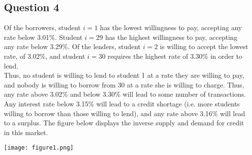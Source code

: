 \documentclass{article}
\begin{document}

\subsection*{Question 4}
Of the borrowers, student $i=1$ has the lowest willingness to pay, accepting any rate below 3.01\%. Student ${i=29}$ has the highest willingness to pay, accepting any rate below 3.29\%. Of the lenders, student ${i=2}$ is willing to accept the lowest rate, of 3.02\%, and student ${i=30}$ requires the highest rate of 3.30\% in order to lend.
\medskip \\
Thus, no student is willing to lend to student 1 at a rate they are willing to pay, and nobody is willing to borrow from 30 at a rate she is willing to charge. Thus, any rate above 3.02\% and below 3.30\% will lead to some number of transactions. Any interest rate below 3.15\% will lead to a credit shortage (i.e. more students willing to borrow than those willing to lend), and any rate above 3.16\% will lead to a surplus. The figure below displays the inverse supply and demand for credit in this market.
\begin{center}
	\texttt{[image: figure1.png]}
\end{center}



\end{document}
